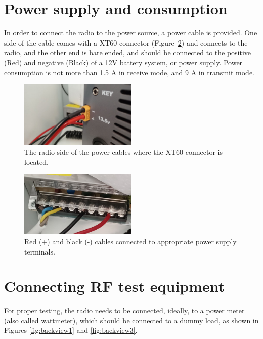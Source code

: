 \documentclass[11pt,a4paper]{article}
\begin{document}
\section{Power supply and consumption}

In order to connect the radio to the power source, a power cable is provided. One side of the
cable comes with a XT60 connector (Figure~\ref{fig:psu2}) and connects to the radio, and the other end is bare ended,
and should be connected to the positive (Red) and negative (Black) of a 12V battery system, or power
supply. Power consumption is not more than 1.5 A in receive mode, and 9 A in transmit mode.

\begin{figure}[!ht]
  \centering
  \includegraphics[width=0.5\textwidth]{pictures/psu1.jpeg}
  \caption{The radio-side of the power cables where the XT60 connector is located.}
  \label{fig:psu1}
\end{figure}

\begin{figure}[!ht]
  \centering
  \includegraphics[width=0.5\textwidth]{pictures/psu2.jpeg}
  \caption{Red (+) and black (-) cables connected to appropriate power supply terminals.}
  \label{fig:psu2}
\end{figure}

\section{Connecting RF test equipment}

For proper testing, the radio needs to be connected, ideally, to a power meter (also called wattmeter), which should be connected to a dummy load, as shown in Figures \ref{fig:backview1} and \ref{fig:backview3}.
\end{document}
